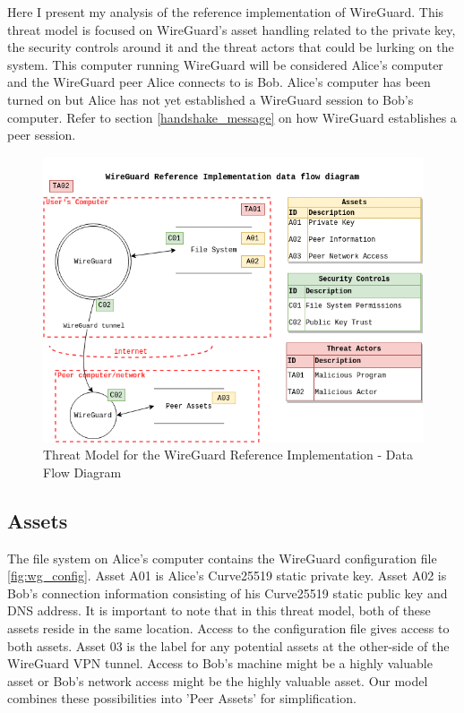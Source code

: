 \documentclass [11pt, proquest] {uwthesis}[2020/02/24]
\begin{document}
Here I present my analysis of the reference implementation of WireGuard. This threat model is focused on WireGuard's asset handling related to the private key, the security controls around it and the threat actors that could be lurking on the system. This computer running WireGuard will be considered Alice's computer and the WireGuard peer Alice connects to is Bob. Alice's computer has been turned on but Alice has not yet established a WireGuard session to Bob's computer. Refer to section \ref{handshake_message} on how WireGuard establishes a peer session. 

\begin{figure}[ht]
\includegraphics[width=14cm]{paper/images/WG_DFD.drawio.png}
\caption{Threat Model for the WireGuard Reference Implementation - Data Flow Diagram}
\label{fig:wg_ref_dfd}
\end{figure}

\subsection{Assets}
The file system on Alice's computer contains the WireGuard configuration file \ref{fig:wg_config}. 
Asset A01 is Alice's Curve25519 static private key. Asset A02 is Bob's connection information consisting of his Curve25519 static public key and DNS address. It is important to note that in this threat model, both of these assets reside in the same location. Access to the configuration file gives access to both assets.
Asset 03 is the label for any potential assets at the other-side of the WireGuard VPN tunnel. Access to Bob's machine might be a highly valuable asset or Bob's network access might be the highly valuable asset. Our model combines these possibilities into 'Peer Assets' for simplification.
\end{document}
